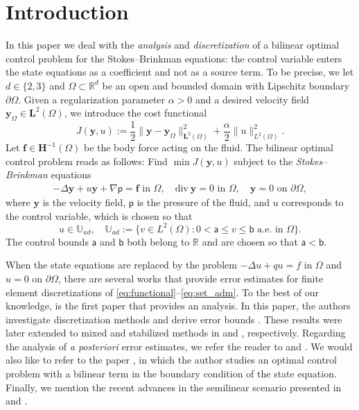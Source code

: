 \documentclass[final]{siamart0216}
\begin{document}
\section{Introduction}
\label{sec:intro}
In this paper we deal with the \emph{analysis} and \emph{discretization} of a bilinear optimal control problem for the Stokes--Brinkman equations: the control variable enters the state equations as a coefficient and not as a source term. To be precise, we let $d\in\{2,3\}$ and $\Omega \subset \mathbb{R}^d$ be an open and bounded domain with Lipschitz boundary $\partial\Omega$. Given a regularization parameter $\alpha>0$ and a desired velocity field $\mathbf{y}_\Omega\in \mathbf{L}^2(\Omega)$, we introduce the cost functional
\begin{equation}\label{eq:functional}
J(\mathbf{y},u) :=
\dfrac{1}{2}\|\mathbf{y}-\mathbf{y}_\Omega\|_{\mathbf{L}^2(\Omega)}^2
+
\dfrac{\alpha}{2}\|u\|^2_{L^2(\Omega)}.
\end{equation}
Let $\mathbf{f} \in \mathbf{H}^{-1}(\Omega)$ be the body force acting on the fluid. The bilinear optimal control problem reads as follows: Find $\min J(\mathbf{y},u)$ subject to the \emph{Stokes--Brinkman} equations
\begin{align}\label{eq:state}
-\Delta \mathbf{y} + u\mathbf{y}+\nabla \mathsf{p} =  \mathbf{f}
\text{ in } \Omega,
\quad
\text{div}~\mathbf{y}  =  0
\text{ in } \Omega,
\quad
\mathbf{y}  =  0
\text{ on } \partial\Omega,
\end{align}
where $\mathbf{y}$ is the velocity field, $\mathsf{p}$ is the pressure of the fluid, and $u$ corresponds to the control variable, which is chosen so that
\begin{equation}\label{eq:set_adm}
u\in \mathbb{U}_{ad},
\quad
\mathbb{U}_{ad}:=
\{
v \in L^2(\Omega): 0<\mathsf{a}\leq v\leq \mathsf{b} \text{ a.e. in } \Omega
\}.
\end{equation}
The control bounds $\mathsf{a}$ and $\mathsf{b}$ both belong to $\mathbb{R}$ and are chosen so that $\mathsf{a} < \mathsf{b}$.

When the state equations are replaced by the problem $-\Delta u + q u = f$ in $\Omega$ and $u = 0$ on $\partial \Omega$, there are several works that provide error estimates for finite element discretizations of \eqref{eq:functional}--\eqref{eq:set_adm}. To the best of our knowledge, \cite{MR2536007} is the first paper that provides an analysis. In this paper, the authors investigate discretization methods and derive error bounds \cite[Corollaries 5.6 and 5.10]{MR2536007}. These results were later extended to mixed and stabilized methods in \cite{MR3103238} and \cite{MR3693332}, respectively. Regarding the analysis of \emph{a posteriori} error estimates, we refer the reader to \cite{MR2680928} and \cite{MR4450052}. We would also like to refer to the paper \cite{MR4081184}, in which the author studies an optimal control problem with a bilinear term in the boundary condition of the state equation. Finally, we mention the recent advances in the semilinear scenario presented in \cite{MR4679130} and \cite{casas2024error}.
\end{document}
